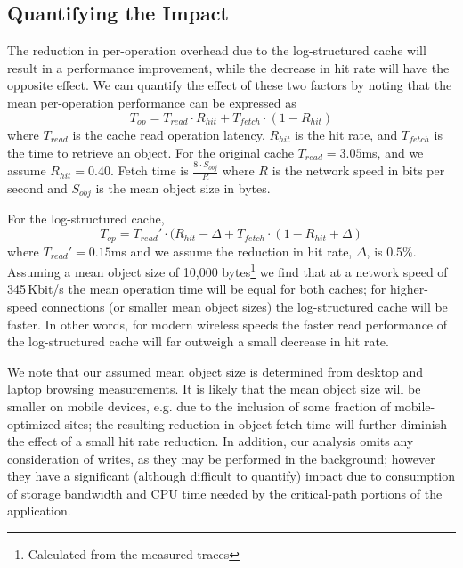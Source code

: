 \documentclass[letterpaper,twocolumn,10pt]{article}
\begin{document}
\subsection{Quantifying the Impact}
The reduction in per-operation overhead due to the log-structured cache will
result in a  performance improvement, while the decrease in hit rate will have
the opposite effect. We can quantify the effect of these two factors by noting
that the mean per-operation performance can be expressed as
\begin{equation}
T_{op} = T_{read}\cdot R_{hit} + T_{fetch}\cdot (1-R_{hit})
\end{equation}
where $T_{read}$ is the cache read operation latency, $R_{hit}$ is the hit rate,
and $T_{fetch}$ is the time to retrieve an object. For the original cache 
$T_{read}=3.05$ms, and we assume $R_{hit}=0.40$. Fetch time is $\frac{8\cdot S_{obj}}{R}$
where $R$ is the network speed in bits per second and $S_{obj}$ is the mean
object size in bytes.

For the log-structured cache, 
\begin{equation}
T_{op} = T_{read}'\cdot (R_{hit}-\Delta + T_{fetch}\cdot (1-R_{hit}+\Delta)
\end{equation}
where $T_{read}'=0.15$ms and we assume the reduction in hit rate, $\Delta$, is $0.5\%$. 
Assuming a mean object size of 10,000 bytes\footnote{Calculated from the
  measured traces} we find that at a network speed of
345\,Kbit/s the mean operation time will be equal for both caches; for
higher-speed connections (or smaller mean object sizes) the log-structured cache
will be faster. 
In other words, for modern wireless speeds the faster read performance
of the log-structured cache will far outweigh a small decrease in hit rate. 

We note that our assumed mean object size is determined from desktop
and laptop browsing measurements. It is likely that the mean object size will be
smaller on mobile devices, e.g. due to the inclusion of some fraction
of mobile-optimized sites; the resulting reduction in object fetch time will
further diminish the effect of a small hit rate reduction.
In addition, our analysis omits any consideration of writes, as they may
be performed in the background; however they have a significant (although
difficult to quantify) impact due to consumption of storage bandwidth and CPU
time needed by the critical-path portions of the application.
\end{document}
